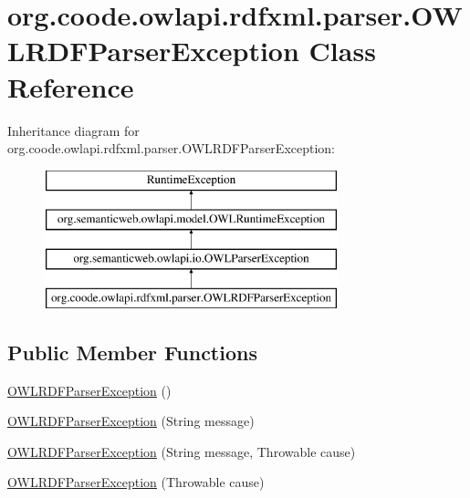 \hypertarget{classorg_1_1coode_1_1owlapi_1_1rdfxml_1_1parser_1_1_o_w_l_r_d_f_parser_exception}{\section{org.\-coode.\-owlapi.\-rdfxml.\-parser.\-O\-W\-L\-R\-D\-F\-Parser\-Exception Class Reference}
\label{classorg_1_1coode_1_1owlapi_1_1rdfxml_1_1parser_1_1_o_w_l_r_d_f_parser_exception}
}
Inheritance diagram for org.\-coode.\-owlapi.\-rdfxml.\-parser.\-O\-W\-L\-R\-D\-F\-Parser\-Exception\-:\begin{figure}[H]
\begin{center}
\leavevmode
\includegraphics[height=4.000000cm]{classorg_1_1coode_1_1owlapi_1_1rdfxml_1_1parser_1_1_o_w_l_r_d_f_parser_exception}
\end{center}
\end{figure}
\subsection*{Public Member Functions}
\begin{DoxyCompactItemize}
\item 
\hyperlink{classorg_1_1coode_1_1owlapi_1_1rdfxml_1_1parser_1_1_o_w_l_r_d_f_parser_exception_aa28c5ea47489553749183cd8372340f3}{O\-W\-L\-R\-D\-F\-Parser\-Exception} ()
\item 
\hyperlink{classorg_1_1coode_1_1owlapi_1_1rdfxml_1_1parser_1_1_o_w_l_r_d_f_parser_exception_a230ccb2c6cfadd68823af76fe1a32cf1}{O\-W\-L\-R\-D\-F\-Parser\-Exception} (String message)
\item 
\hyperlink{classorg_1_1coode_1_1owlapi_1_1rdfxml_1_1parser_1_1_o_w_l_r_d_f_parser_exception_a5d735af58e30701379501447d88f7f82}{O\-W\-L\-R\-D\-F\-Parser\-Exception} (String message, Throwable cause)
\item 
\hyperlink{classorg_1_1coode_1_1owlapi_1_1rdfxml_1_1parser_1_1_o_w_l_r_d_f_parser_exception_aca59fa99b8b48158cbb3c322c0738912}{O\-W\-L\-R\-D\-F\-Parser\-Exception} (Throwable cause)
\end{DoxyCompactItemize}
